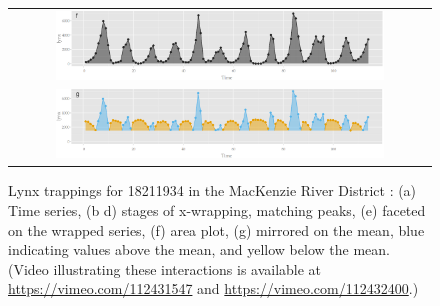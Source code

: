 \documentclass[12pt]{article}
\begin{document}
\begin{figure}[htp]
\begin{center}
\begin{tabular}{cc}
\multicolumn{2}{c}{\includegraphics[width=0.8\textwidth]{graph/pipeline-18-original}} \\
\multicolumn{2}{c}{\includegraphics[width=0.8\textwidth]{graph/pipeline-18-mirrored}} \\
\end{tabular}
\caption{\label{fig:x-wrapping}Lynx trappings for 1821\textendash{}1934 in the MacKenzie River District
\citep{campbell1977survey}: (a) Time series, (b \textendash{} d) stages of x-wrapping, matching peaks, (e) faceted on the wrapped series, (f) area plot, (g) mirrored on the mean, blue indicating values above the mean, and yellow below the mean.  (Video illustrating these interactions is available at \url{https://vimeo.com/112431547} and \url{https://vimeo.com/112432400}.)}
\end{center}
\end{figure}
\end{document}
